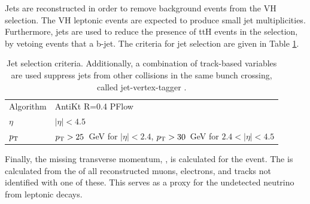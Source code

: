 Jets are reconstructed in order to remove background events from the VH selection.
The VH leptonic events are expected to produce small jet multiplicities.
Furthermore, jets are used to reduce the presence of ttH events in the selection, by vetoing events that a b-jet.
The criteria for jet selection are given in Table \ref{tab:hmmJetObjSel}.

\begin{table}[H]
    \caption{Jet selection criteria. Additionally, a combination of track-based variables are used suppress jets from other collisions in the same bunch crossing, called jet-vertex-tagger \cite{ATLAS-CONF-2014-018}.}
    \begin{center}
    \begin{tabular}{ll}
        \toprule
        Algorithm        &AntiKt R=0.4 PFlow\\
        $\eta$            &$|\eta| < 4.5$    \\
        $p_\text{T}$            &$p_\text{T} > 25$~GeV for $|\eta| < 2.4$, $p_\text{T} > 30$~GeV for $2.4 < |\eta| < 4.5$ \\
        \bottomrule
    \end{tabular}
    \label{tab:hmmJetObjSel}
    \end{center}
\end{table}

Finally, the missing transverse momentum, \met, is calculated for the event.
The \met is calculated from the \pt of all reconstructed muons, electrons, and tracks not identified with one of these.
This serves as a proxy for the undetected neutrino from leptonic \W decays.

